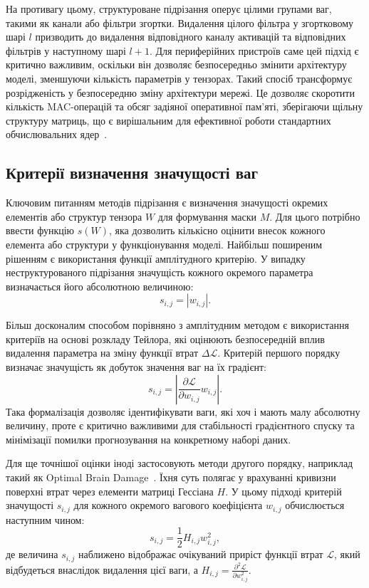 \documentclass{pma-mthesis}
\begin{document}
На противагу цьому, структуроване підрізання оперує цілими групами ваг, такими як канали або фільтри згортки. Видалення цілого фільтра у згортковому шарі $l$ призводить до видалення відповідного каналу активацій та відповідних фільтрів у наступному шарі $l+1$. Для периферійних пристроїв саме цей підхід є критично важливим, оскільки він дозволяє безпосередньо змінити архітектуру моделі, зменшуючи кількість параметрів у тензорах. Такий спосіб трансформує розрідженість у безпосередню зміну архітектури мережі. Це дозволяє скоротити кількість MAC-операцій та обсяг задіяної оперативної пам’яті, зберігаючи щільну структуру матриць, що є вирішальним для ефективної роботи стандартних обчислювальних ядер~\cite{molchanov2017pruning}.

\subsection{Критерії визначення значущості ваг}

Ключовим питанням методів підрізання є визначення значущості окремих елементів або структур тензора $W$ для формування маски $M$. Для цього потрібно ввести функцію $s(W)$, яка дозволить кількісно оцінити внесок кожного елемента або структури у функціонування моделі. Найбільш поширеним рішенням є використання функції амплітудного критерію. У випадку неструктурованого підрізання значущість кожного окремого параметра визначається його абсолютною величиною:
\begin{equation}
    s_{i,j} = |w_{i,j}|.
\end{equation}

Більш досконалим способом порівняно з амплітудним методом є використання критеріїв на основі розкладу Тейлора, які оцінюють безпосередній вплив видалення параметра на зміну функції втрат $\Delta \mathcal{L}$. Критерій першого порядку визначає значущість як добуток значення ваг на їх градієнт:
\begin{equation}
    s_{i,j} = \left| \frac{\partial \mathcal{L}}{\partial w_{i,j}} w_{i,j} \right|.
\end{equation}
Така формалізація дозволяє ідентифікувати ваги, які хоч і мають малу абсолютну величину, проте є критично важливими для стабільності градієнтного спуску та мінімізації помилки прогнозування на конкретному наборі даних.

Для ще точнішої оцінки іноді застосовують методи другого порядку, наприклад такий як Optimal Brain Damage~\cite{lecun1989optimal}. Їхня суть полягає у врахуванні кривизни поверхні втрат через елементи матриці Гессіана $H$. У цьому підході критерій значущості $s_{i,j}$ для кожного окремого вагового коефіцієнта $w_{i,j}$ обчислюється наступним чином:
\begin{equation}
    s_{i,j} = \frac{1}{2} H_{i,j} w_{i,j}^2,
\end{equation}
де величина $s_{i,j}$ наближено відображає очікуваний приріст функції втрат $\mathcal{L}$, який відбудеться внаслідок видалення цієї ваги, а $H_{i,j} = \frac{\partial^2 \mathcal{L}}{\partial w_{i,j}^2}$. 
\end{document}
